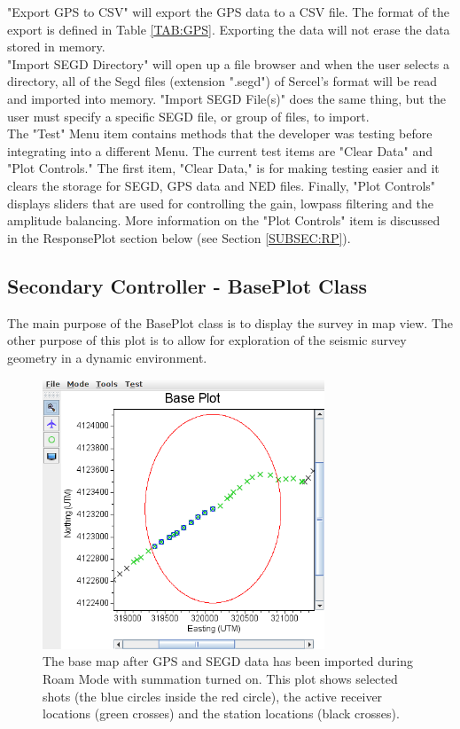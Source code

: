 \documentclass[12pt]{article}
\begin{document}
"Export GPS to CSV" will export the GPS data to a CSV file. The format of the export is defined in Table \ref{TAB:GPS}. Exporting the data will not erase the data stored in memory. \\

"Import SEGD Directory" will open up a file browser and when the user selects a directory, all of the Segd files (extension ".segd") of Sercel's format will be read and imported into memory. "Import SEGD File(s)" does the same thing, but the user must specify a specific SEGD file, or group of files, to import. \\

The "Test" Menu item contains methods that the developer was testing before integrating into a different Menu. The current test items are "Clear Data" and "Plot Controls." The first item, "Clear Data," is for making testing easier and it clears the storage for SEGD, GPS data and NED files. Finally, "Plot Controls" displays sliders that are used for controlling the gain, lowpass filtering and the amplitude balancing. More information on the "Plot Controls" item is discussed in the ResponsePlot section below (see Section \ref{SUBSEC:RP}).

\subsection{Secondary Controller - BasePlot Class}
\label{SUBSEC:BPC}

The main purpose of the BasePlot class is to display the survey in map view. The other purpose of this plot is to allow for exploration of the seismic survey geometry in a dynamic environment. \\

\begin{figure}[h]
\centering
\includegraphics[width=0.75\textwidth]{./figs/fig1.png}
\caption{The base map after GPS and SEGD data has been imported during Roam Mode with summation turned on. This plot shows selected shots (the blue circles inside the red circle), the active receiver locations (green crosses) and the station locations (black crosses).}
\label{FIG:BP}
\end{figure}
\end{document}
